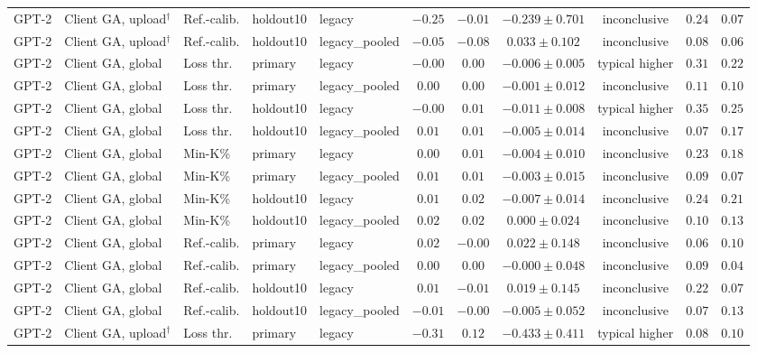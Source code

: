 {\begin{longtable}{@{\extracolsep{\fill}}lllllcccccc@{}}
GPT-2 & Client GA, upload$^{\dagger}$ & Ref.-calib. & holdout10 & legacy & $-0.25$ & $-0.01$ & $-0.239 \pm 0.701$ & inconclusive & $0.24$ & $0.07$ \\
GPT-2 & Client GA, upload$^{\dagger}$ & Ref.-calib. & holdout10 & legacy\_pooled & $-0.05$ & $-0.08$ & $0.033 \pm 0.102$ & inconclusive & $0.08$ & $0.06$ \\
GPT-2 & Client GA, global & Loss thr. & primary & legacy & $-0.00$ & $0.00$ & $-0.006 \pm 0.005$ & typical higher & $0.31$ & $0.22$ \\
GPT-2 & Client GA, global & Loss thr. & primary & legacy\_pooled & $0.00$ & $0.00$ & $-0.001 \pm 0.012$ & inconclusive & $0.11$ & $0.10$ \\
GPT-2 & Client GA, global & Loss thr. & holdout10 & legacy & $-0.00$ & $0.01$ & $-0.011 \pm 0.008$ & typical higher & $0.35$ & $0.25$ \\
GPT-2 & Client GA, global & Loss thr. & holdout10 & legacy\_pooled & $0.01$ & $0.01$ & $-0.005 \pm 0.014$ & inconclusive & $0.07$ & $0.17$ \\
GPT-2 & Client GA, global & Min-K\% & primary & legacy & $0.00$ & $0.01$ & $-0.004 \pm 0.010$ & inconclusive & $0.23$ & $0.18$ \\
GPT-2 & Client GA, global & Min-K\% & primary & legacy\_pooled & $0.01$ & $0.01$ & $-0.003 \pm 0.015$ & inconclusive & $0.09$ & $0.07$ \\
GPT-2 & Client GA, global & Min-K\% & holdout10 & legacy & $0.01$ & $0.02$ & $-0.007 \pm 0.014$ & inconclusive & $0.24$ & $0.21$ \\
GPT-2 & Client GA, global & Min-K\% & holdout10 & legacy\_pooled & $0.02$ & $0.02$ & $0.000 \pm 0.024$ & inconclusive & $0.10$ & $0.13$ \\
GPT-2 & Client GA, global & Ref.-calib. & primary & legacy & $0.02$ & $-0.00$ & $0.022 \pm 0.148$ & inconclusive & $0.06$ & $0.10$ \\
GPT-2 & Client GA, global & Ref.-calib. & primary & legacy\_pooled & $0.00$ & $0.00$ & $-0.000 \pm 0.048$ & inconclusive & $0.09$ & $0.04$ \\
GPT-2 & Client GA, global & Ref.-calib. & holdout10 & legacy & $0.01$ & $-0.01$ & $0.019 \pm 0.145$ & inconclusive & $0.22$ & $0.07$ \\
GPT-2 & Client GA, global & Ref.-calib. & holdout10 & legacy\_pooled & $-0.01$ & $-0.00$ & $-0.005 \pm 0.052$ & inconclusive & $0.07$ & $0.13$ \\
GPT-2 & Client GA, upload$^{\dagger}$ & Loss thr. & primary & legacy & $-0.31$ & $0.12$ & $-0.433 \pm 0.411$ & typical higher & $0.08$ & $0.10$ \\

\end{longtable}}
